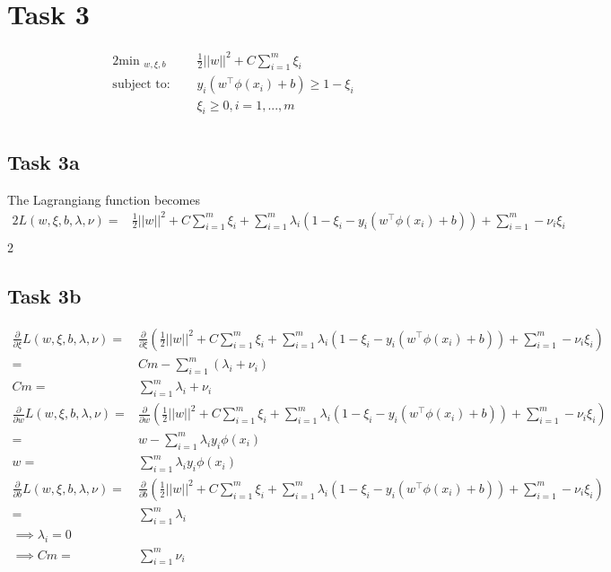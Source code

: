 \documentclass{article}
\begin{document}
	\section*{Task 3}
		\begin{alignat}{2}
			\text{min }_{w, \xi, b} \quad& \frac{1}{2}||w||^2+ C \sum_{i=1}^{m}\xi_i \\
			\text{subject to: } \quad& y_i(w^\top \phi(x_i) +b) \geq 1- \xi_i\\
			&\xi_i \geq 0, i=1,...,m \\
		\end{alignat}
	\subsection*{Task 3a}
		The Lagrangiang function becomes
		\begin{alignat}{2}
			L(w, \xi, b, \lambda, \nu) =& \frac{1}{2}||w||^2+ C \sum_{i=1}^{m}\xi_i + \sum_{i=1}^{m}\lambda_i\left( 1-\xi_i - y_i(w^\top \phi(x_i) +b)\right) + \sum_{i= 1}^{m} -\nu_i\xi_i \\
		\end{alignat}{2}
	\subsection*{Task 3b}
		\begin{align}
			\frac{\partial}{\partial \xi} L(w, \xi, b, \lambda, \nu) =& \frac{\partial}{\partial \xi} \left( \frac{1}{2}||w||^2+ C \sum_{i=1}^{m}\xi_i + \sum_{i=1}^{m}\lambda_i\left( 1-\xi_i - y_i(w^\top \phi(x_i) +b)\right) + \sum_{i= 1}^{m} -\nu_i\xi_i\right)  \\
			=&   Cm - \sum_{i=1}^{m}\left( \lambda_i +\nu_i\right)  \\
			Cm =&   \sum_{i=1}^{m} \lambda_i +\nu_i  \\
			\frac{\partial}{\partial w} L(w, \xi, b, \lambda, \nu) =& \frac{\partial}{\partial w} \left( \frac{1}{2}||w||^2+ C \sum_{i=1}^{m}\xi_i + \sum_{i=1}^{m}\lambda_i\left( 1-\xi_i - y_i(w^\top \phi(x_i) +b)\right) + \sum_{i= 1}^{m} -\nu_i\xi_i\right)  \\
			=& w - \sum_{i=1}^{m}\lambda_i y_i \phi(x_i) \\
			w =& \sum_{i=1}^{m}\lambda_i y_i \phi(x_i) \\
			\frac{\partial}{\partial b} L(w, \xi, b, \lambda, \nu) =& \frac{\partial}{\partial b} \left( \frac{1}{2}||w||^2+ C \sum_{i=1}^{m}\xi_i + \sum_{i=1}^{m}\lambda_i\left( 1-\xi_i - y_i(w^\top \phi(x_i) +b)\right) + \sum_{i= 1}^{m} -\nu_i\xi_i\right)  \\
			=& \sum_{i=1}^{m}\lambda_i  \\
			\implies \lambda_i = 0 \\
			\implies Cm =&   \sum_{i=1}^{m} \nu_i  \\
		\end{align}
\end{document}
